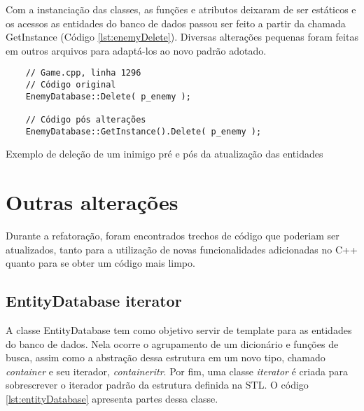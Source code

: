 Com a instanciação das classes, as funções e atributos deixaram de ser estáticos e os acessos 
as entidades do banco de dados passou ser feito a partir da chamada GetInstance (Código \ref{lst:enemyDelete}). 
Diversas alterações pequenas foram feitas em outros arquivos para adaptá-los ao novo padrão adotado.

\begin{listing}[!ht]
    \begin{verbatim}
    // Game.cpp, linha 1296
    // Código original
    EnemyDatabase::Delete( p_enemy );

    // Código pós alterações
    EnemyDatabase::GetInstance().Delete( p_enemy );
    \end{verbatim}
\caption{Exemplo de deleção de um inimigo pré e pós da atualização das entidades}
\label{lst:enemyDelete}
\end{listing}

\section{Outras alterações}

Durante a refatoração, foram encontrados trechos de código que poderiam ser atualizados, tanto
para a utilização de novas funcionalidades adicionadas no C++ quanto para se obter um código mais limpo.

\subsection{EntityDatabase iterator}

A classe EntityDatabase tem como objetivo servir de template para as entidades do banco de dados. 
Nela ocorre o agrupamento de um dicionário e funções de busca, assim como a abstração dessa 
estrutura em um novo tipo, chamado \textit{container} e seu iterador, \textit{containeritr}. 
Por fim, uma classe \textit{iterator} é criada para sobrescrever o iterador padrão da estrutura 
definida na STL. O código \ref{lst:entityDatabase} apresenta partes dessa classe.


